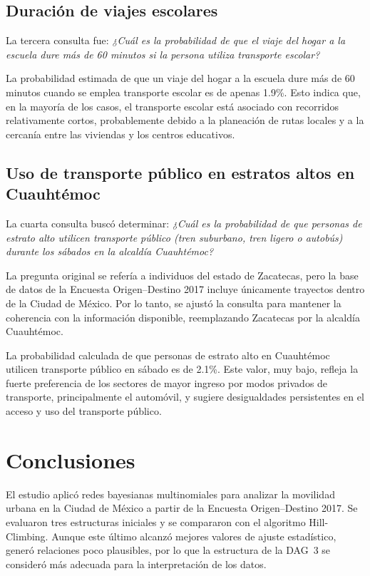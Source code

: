 \documentclass[eng]{ajceam-class}
\begin{document}
\subsection{Duración de viajes escolares}

La tercera consulta fue: \textit{¿Cuál es la probabilidad de que el viaje del hogar a la escuela dure más de 60 minutos si la persona utiliza transporte escolar?}

La probabilidad estimada de que un viaje del hogar a la escuela dure más de 60 minutos cuando se emplea transporte escolar es de apenas 1.9\%. Esto indica que, en la mayoría de los casos, el transporte escolar está asociado con recorridos relativamente cortos, probablemente debido a la planeación de rutas locales y a la cercanía entre las viviendas y los centros educativos.

\subsection{Uso de transporte público en estratos altos en Cuauhtémoc}

La cuarta consulta buscó determinar: \textit{¿Cuál es la probabilidad de que personas de estrato alto utilicen transporte público (tren suburbano, tren ligero o autobús) durante los sábados en la alcaldía Cuauhtémoc?}

La pregunta original se refería a individuos del estado de Zacatecas, pero la base de datos de la Encuesta Origen--Destino 2017 incluye únicamente trayectos dentro de la Ciudad de México. Por lo tanto, se ajustó la consulta para mantener la coherencia con la información disponible, reemplazando Zacatecas por la alcaldía Cuauhtémoc.

La probabilidad calculada de que personas de estrato alto en Cuauhtémoc utilicen transporte público en sábado es de 2.1\%. Este valor, muy bajo, refleja la fuerte preferencia de los sectores de mayor ingreso por modos privados de transporte, principalmente el automóvil, y sugiere desigualdades persistentes en el acceso y uso del transporte público.

\section{Conclusiones}
El estudio aplicó redes bayesianas multinomiales para analizar la movilidad urbana en la Ciudad de México a partir de la Encuesta Origen--Destino 2017. Se evaluaron tres estructuras iniciales y se compararon con el algoritmo Hill-Climbing. Aunque este último alcanzó mejores valores de ajuste estadístico, generó relaciones poco plausibles, por lo que la estructura de la DAG~3 se consideró más adecuada para la interpretación de los datos.
\end{document}
